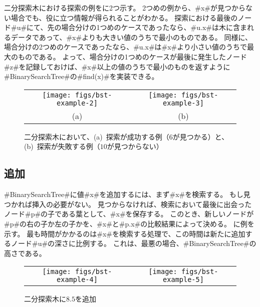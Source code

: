 二分探索木における探索の例をに2つ示す。
2つめの例から、#x#が見つからない場合でも、役に立つ情報が得られることがわかる。
探索における最後のノード#u#にて、先の場合分けの1つめのケースであったなら、#u.x#は木に含まれるデータであって、#x#よりも大きい値のうちで最小のものである。
同様に、場合分けの2つめのケースであったなら、#u.x#は#x#より小さい値のうちで最大のものである。
よって、場合分けの1つめのケースが最後に発生したノード#z#を記録しておけば、#x#以上の値のうちで最小のものを返すように#BinarySearchTree#の#find(x)#を実装できる。

\begin{figure}
  \begin{center}
    \begin{tabular}{cc}
    \texttt{[image: figs/bst-example-2]} &
    \texttt{[image: figs/bst-example-3]} \\
    (a) & (b)
    \end{tabular}
  \end{center}
  \caption{二分探索木において、(a)~探索が成功する例（$6$が見つかる）と、(b)~探索が失敗する例（$10$が見つからない）}
\end{figure}


\subsection{追加}

#BinarySearchTree#に値#x#を追加するには、まず#x#を検索する。
もし見つかれば挿入の必要がない。
見つからなければ、検索において最後に出会ったノード#p#の子である葉として、#x#を保存する。
このとき、新しいノードが#p#の右の子か左の子かを、#x#と#p.x#の比較結果によって決める。
に例を示す。
最も時間がかかるのは#x#を検索する処理で、この時間は新たに追加するノード#u#の深さに比例する。
これは、最悪の場合、#BinarySearchTree#の高さである。

\begin{figure}
  \begin{center}
    \begin{tabular}{cc}
    \texttt{[image: figs/bst-example-4]} &
    \texttt{[image: figs/bst-example-5]}
    \end{tabular}
  \end{center}
  \caption{二分探索木に$8.5$を追加}
\end{figure}


